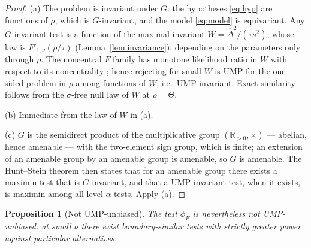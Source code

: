 \documentclass[11pt]{article}
\newtheorem{proposition}{Proposition}
\theoremstyle{remark}
\newcommand{\Dhat}{\hat{\Delta}}
\newcommand{\R}{\mathbb{R}}
\begin{document}
\begin{proof}
(a) The problem is invariant under $G$: the hypotheses \eqref{eq:hyp} are functions of $\rho$, which is $G$-invariant, and the model \eqref{eq:model} is equivariant. Any $G$-invariant test is a function of the maximal invariant $W=\Dhat^2/(\tau s^2)$, whose law is $F'_{1,\nu}(\rho/\tau)$ (Lemma~\ref{lem:invariance}), depending on the parameters only through $\rho$. The noncentral $F$ family has monotone likelihood ratio in $W$ with respect to its noncentrality \citep[Ch.~3]{lehmann2005}; hence rejecting for small $W$ is UMP for the one-sided problem in $\rho$ among functions of $W$, i.e.\ UMP invariant. Exact similarity follows from the $\sigma$-free null law of $W$ at $\rho=\Theta$.

(b) Immediate from the law of $W$ in (a).

(c) $G$ is the semidirect product of the multiplicative group $(\R_{>0},\times)$ --- abelian, hence amenable --- with the two-element sign group, which is finite; an extension of an amenable group by an amenable group is amenable, so $G$ is amenable. The Hunt--Stein theorem \citep[Thm.~8.5.1]{lehmann2005} then states that for an amenable group there exists a maximin test that is $G$-invariant, and that a UMP invariant test, when it exists, is maximin among all level-$\alpha$ tests. Apply (a).
\end{proof}

\begin{proposition}[Not UMP-unbiased]\label{res:umpu}
The test $\phi_F$ is nevertheless \emph{not} UMP-unbiased: at small $\nu$ there exist boundary-similar tests with strictly greater power against particular alternatives.
\end{proposition}
\end{document}
